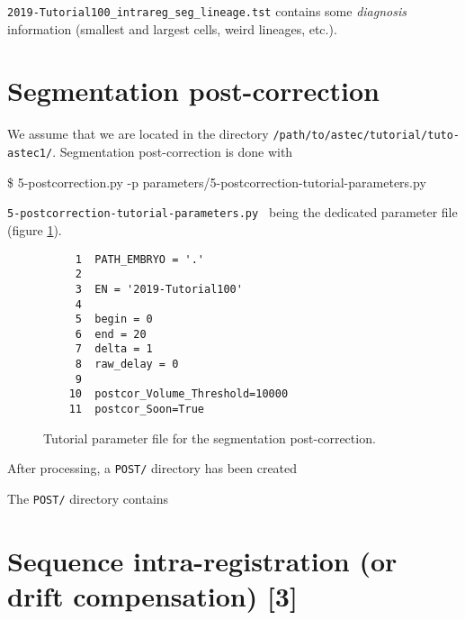 \texttt{2019-Tutorial100\_intrareg\_seg\_lineage.tst} contains some
\textit{diagnosis} information (smallest and largest cells, weird
lineages, etc.). 



\section{Segmentation post-correction}

We assume that we are located in the directory
\texttt{/path/to/astec/tutorial/tuto-astec1/}. Segmentation post-correction is
done with
\begin{code}{0.8}
  \$ 5-postcorrection.py -p parameters/5-postcorrection-tutorial-parameters.py 
\end{code}
\texttt{5-postcorrection-tutorial-parameters.py } being the
dedicated parameter file  (figure
\ref{fig:tutorial:parameter:post:correction}).


\begin{figure}
\begin{framed}
\begin{verbatim}
     1	PATH_EMBRYO = '.'
     2	
     3	EN = '2019-Tutorial100'
     4	
     5	begin = 0
     6	end = 20
     7	delta = 1
     8	raw_delay = 0
     9	
    10	postcor_Volume_Threshold=10000 	
    11	postcor_Soon=True 				
\end{verbatim}
\end{framed}
\caption{\label{fig:tutorial:parameter:post:correction} Tutorial
  parameter file for the segmentation post-correction.}
\end{figure}

After processing, a \texttt{POST/} directory has been created

\mbox{}
\mbox{}

The \texttt{POST/} directory contains

\mbox{}
\mbox{}



\section{Sequence intra-registration (or drift compensation) [3]}
\label{sec:tutorial:intra:registration:post}
 
